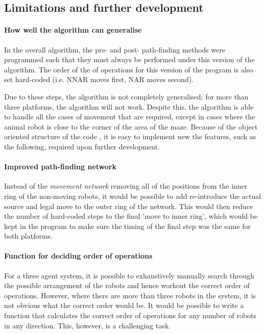 \subsection{Limitations and further development}

\paragraph{How well the algorithm can generalise} In the overall algorithm, the pre- and post- path-finding methods were programmed such that they must always be performed under this version of the algorithm. The order of the of operations for this version of the program is also set hard-coded (i.e. NNAR moves first, NAR moves second). %

Due to these steps, the algorithm is not completely generalised; for more than three platforms, the algorithm will not work. Despite this, the algorithm is able to handle all the cases of movement that are required, except in cases where the animal robot is close to the corner of the area of the maze.
Because of the object oriented structure of the code \cite{SOLID_book}, it is easy to implement new the features, such as the following, required upon further development. 

\paragraph{Improved path-finding network} Instead of the\textit{ movement network} removing all of the positions from the inner ring of the non-moving robots, it would be possible to add re-introduce the actual source and legal move to the outer ring of the network. This would then reduce the number of hard-coded steps to the final 'move to inner ring', which would be kept in the program to make sure the timing of the final step was the same for both platforms.
\paragraph{Function for deciding order of operations}

For a three agent system, it is possible to exhaustively manually search through the possible arrangement of the robots and hence workout the correct order of operations. However, where there are more than three robots in the system, it is not obvious what the correct order would be. It would be possible to write a function that calculates the correct order of operations for any number of robots in any direction. This, however, is a challenging task.

